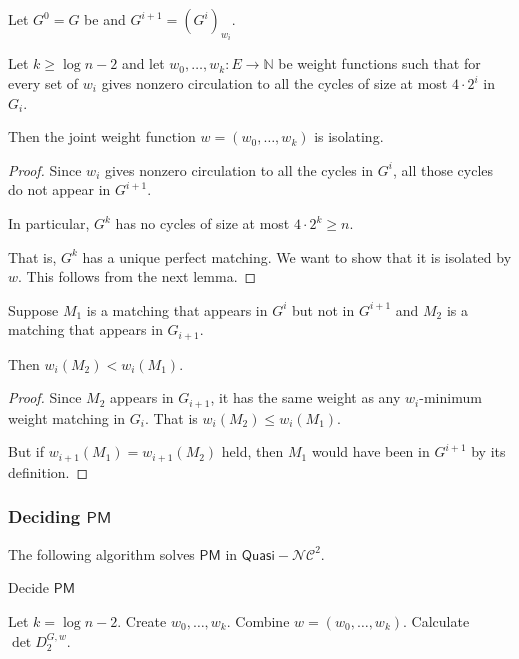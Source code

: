 \documentclass{beamer}
\theoremstyle{remark}
\newcommand{\nn}{\mathbb{N}}
\newcommand{\dpm}{\mathsf{PM}}
\newcommand{\nc}{{\mathcal{NC}}}
\begin{document}
\begin{frame}[allowframebreaks]
  \begin{theorem}
    Let $G^0 = G$ be and $G^{i+1} = {\left(G^{i}\right)}_{w_i}$.

    Let $k \ge \log n - 2$ and let $w_0, \ldots, w_k : E \to \nn$ be weight functions
    such that for every set of $w_i$ gives nonzero circulation to all the
    cycles of size at most $4 \cdot 2^i$ in $G_{i}$.

    Then the joint weight function $w = (w_0, \ldots, w_k)$ is isolating.
  \end{theorem}

  \begin{proof}
    Since $w_i$ gives nonzero circulation to all the cycles
    in $G^i$, all those cycles do not appear in $G^{i+1}$.

    In particular, $G^k$ has no cycles of size at most $4 \cdot 2^k \ge n$.

    That is, $G^k$ has a unique perfect matching.
    We want to show that it is isolated by $w$.
    This follows from the next lemma.
  \end{proof}

  \begin{lemma}
    Suppose $M_1$ is a matching that appears in $G^i$ but not in $G^{i+1}$ and $M_2$ is a matching
    that appears in $G_{i+1}$.

    Then $w_i(M_2) < w_i(M_1)$.
  \end{lemma}

  \begin{proof}
    Since $M_2$ appears in $G_{i+1}$, it has
    the same weight as any $w_i$-minimum weight matching in $G_i$.
    That is $w_{i}(M_2) \le w_i(M_1)$.

    But if $w_{i+1}(M_1) = w_{i+1}(M_2)$ held, then $M_1$ would have been in $G^{i+1}$
    by its definition.
  \end{proof}

\end{frame}

\begin{frame}
  \frametitle{Deciding $\dpm$}
  The following algorithm solves $\dpm$ in $\mathsf{Quasi-}\nc^2$.

  \begin{algorithm}[H]
    \caption{Decide $\dpm$}\label{alg:cap}
    \begin{algorithmic}
      \STATE Let $k = \log n - 2$.
      \STATE Create $w_0, \ldots, w_k$.
      \STATE Combine $w = (w_0, \ldots, w_k)$.
      \STATE Calculate $\det D_2^{G, w}$.
      \ENDIF
      \ENDFOR
    \end{algorithmic}
  \end{algorithm}
\end{frame}
\end{document}

